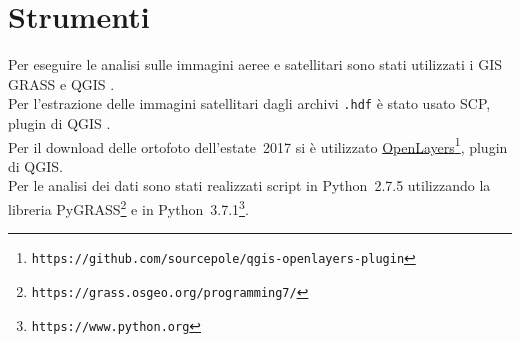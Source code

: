 \section{Strumenti}
Per eseguire le analisi sulle immagini aeree e satellitari sono stati utilizzati i GIS GRASS  e QGIS . 
\\
Per l'estrazione delle immagini satellitari \AST{} dagli archivi \texttt{.hdf} è stato usato SCP, plugin di QGIS . 
\\
Per il download delle ortofoto dell'estate~2017 si è utilizzato \href{https://github.com/sourcepole/qgis-openlayers-plugin}{OpenLayers}\footnote{\texttt{https://github.com/sourcepole/qgis-openlayers-plugin}}, plugin di QGIS.
\\
Per le analisi dei dati sono stati realizzati script in Python~2.7.5 utilizzando la libreria PyGRASS\footnote{\texttt{https://grass.osgeo.org/programming7/}}  e in Python~3.7.1\footnote{\texttt{https://www.python.org}}.
